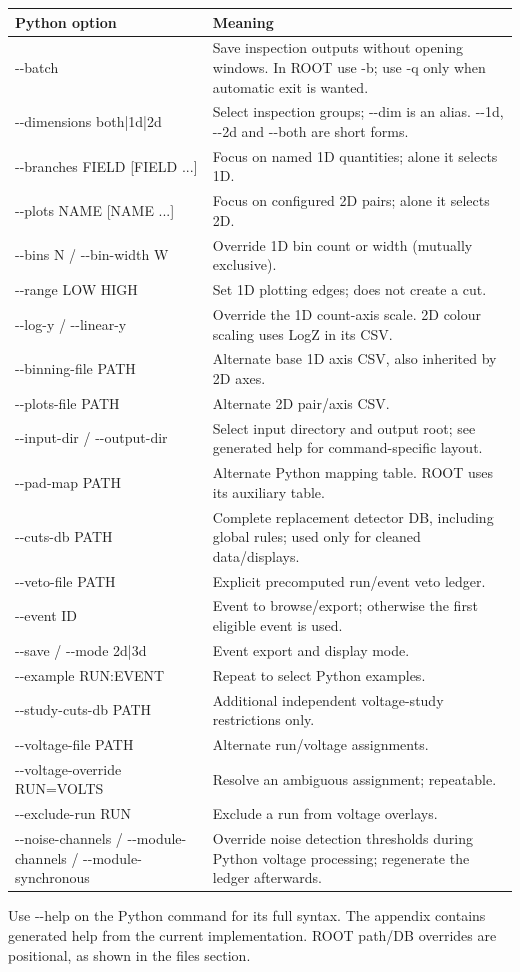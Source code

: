\documentclass[11pt,a4paper]{article}
\begin{document}
\begin{longtable}{p{.35\linewidth}p{.57\linewidth}}
\toprule Python option & Meaning \\\midrule
-{}-batch & Save inspection outputs without opening windows. In ROOT use -b; use -q only when automatic exit is wanted.\\
-{}-dimensions both|1d|2d & Select inspection groups; -{}-dim is an alias. -{}-1d, -{}-2d and -{}-both are short forms.\\
-{}-branches FIELD [FIELD ...] & Focus on named 1D quantities; alone it selects 1D.\\
-{}-plots NAME [NAME ...] & Focus on configured 2D pairs; alone it selects 2D.\\
-{}-bins N / -{}-bin-width W & Override 1D bin count or width (mutually exclusive).\\
-{}-range LOW HIGH & Set 1D plotting edges; does not create a cut.\\
-{}-log-y / -{}-linear-y & Override the 1D count-axis scale. 2D colour scaling uses LogZ in its CSV.\\
-{}-binning-file PATH & Alternate base 1D axis CSV, also inherited by 2D axes.\\
-{}-plots-file PATH & Alternate 2D pair/axis CSV.\\
-{}-input-dir / -{}-output-dir & Select input directory and output root; see generated help for command-specific layout.\\
-{}-pad-map PATH & Alternate Python mapping table. ROOT uses its auxiliary table.\\
-{}-cuts-db PATH & Complete replacement detector DB, including global rules; used only for cleaned data/displays.\\
-{}-veto-file PATH & Explicit precomputed run/event veto ledger.\\
-{}-event ID & Event to browse/export; otherwise the first eligible event is used.\\
-{}-save / -{}-mode 2d|3d & Event export and display mode.\\
-{}-example RUN:EVENT & Repeat to select Python examples.\\
-{}-study-cuts-db PATH & Additional independent voltage-study restrictions only.\\
-{}-voltage-file PATH & Alternate run/voltage assignments.\\
-{}-voltage-override RUN=VOLTS & Resolve an ambiguous assignment; repeatable.\\
-{}-exclude-run RUN & Exclude a run from voltage overlays.\\
-{}-noise-channels / -{}-module-channels / -{}-module-synchronous & Override noise detection thresholds during Python voltage processing; regenerate the ledger afterwards.\\
\bottomrule
\end{longtable}
Use -{}-help on the Python command for its full syntax. The appendix contains generated
help from the current implementation. ROOT path/DB overrides are positional, as
shown in the files section.
\end{document}
